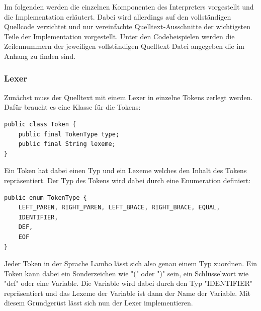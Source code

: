 \documentclass[ngerman]{article}
\begin{document}
Im folgenden werden die einzelnen Komponenten des Interpreters vorgestellt und die Implementation erläutert. Dabei wird allerdings auf den vollständigen Quellcode verzichtet und nur vereinfachte Quelltext-Ausschnitte der wichtigsten Teile der Implementation vorgestellt. Unter den Codebeispielen werden die Zeilennummern der jeweiligen vollständigen Quelltext Datei angegeben die im Anhang zu finden sind.

\subsubsection{Lexer}

Zunächst muss der Quelltext mit einem Lexer in einzelne Tokens zerlegt werden. Dafür braucht es eine Klasse für die Tokens:
\begin{lstlisting}[caption={TODO: Referenz zu Anhang}, captionpos=b]
public class Token {
    public final TokenType type;
    public final String lexeme;
}
\end{lstlisting}
Ein Token hat dabei einen Typ und ein Lexeme welches den Inhalt des Tokens repräsentiert. Der Typ des Tokens wird dabei durch eine Enumeration definiert:
\begin{lstlisting}[caption={TODO: Referenz zu Anhang}, captionpos=b]
public enum TokenType {
    LEFT_PAREN, RIGHT_PAREN, LEFT_BRACE, RIGHT_BRACE, EQUAL,
    IDENTIFIER,
    DEF,
    EOF
}
\end{lstlisting}
Jeder Token in der Sprache Lambo lässt sich also genau einem Typ zuordnen. Ein Token kann dabei ein Sonderzeichen wie "(" oder ")" sein, ein Schlüsselwort wie "def" oder eine Variable. Die Variable wird dabei durch den Typ "IDENTIFIER" repräsentiert und das Lexeme der Variable ist dann der Name der Variable.
Mit diesem Grundgerüst lässt sich nun der Lexer implementieren.
\end{document}
